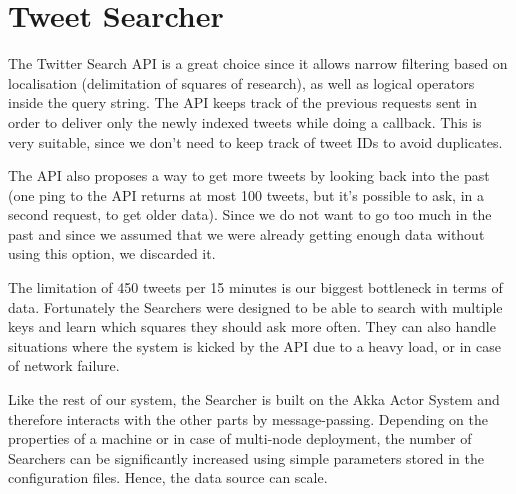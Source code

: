\section{Tweet Searcher}

The Twitter Search API is a great choice since it allows narrow filtering based on localisation (delimitation of squares of research), as well as logical operators inside the query string. The API keeps track of the previous requests sent in order to deliver only the newly indexed tweets while doing a callback. This is very suitable, since we don't need to keep track of tweet IDs to avoid duplicates.

The API also proposes a way to get more tweets by looking back into the past (one ping to the API returns at most 100 tweets, but it's possible to ask, in a second request, to get older data). Since we do not want to go too much in the past and since we assumed that we were already getting enough data without using this option, we discarded it.

The limitation of 450 tweets per 15 minutes is our biggest bottleneck in terms of data. Fortunately the Searchers were designed to be able to search with multiple keys and learn which squares they should ask more often. They can also handle situations where the system is kicked by the API due to a heavy load, or in case of network failure.

Like the rest of our system, the Searcher is built on the Akka Actor System and therefore interacts with the other parts by message-passing. Depending on the properties of a machine or in case of multi-node deployment, the number of Searchers can be significantly increased using simple parameters stored in the configuration files. Hence, the data source can scale.
